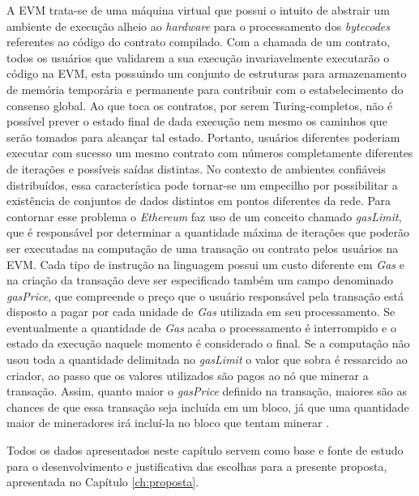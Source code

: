 %
A \ac{EVM} trata-se de uma máquina virtual que possui o intuito de abstrair um ambiente de execução alheio ao \textit{hardware} para o processamento dos \textit{bytecodes} referentes ao código do contrato compilado. Com a chamada de um contrato, todos os usuários que validarem a sua execução invariavelmente executarão o código na \ac{EVM}, esta possuindo um conjunto de estruturas para armazenamento de memória temporária e permanente para contribuir com o estabelecimento do consenso global.
%
Ao que toca os contratos, por serem Turing-completos, não é possível prever o estado final de dada execução nem mesmo os caminhos que serão tomados para alcançar tal estado. 
%
Portanto, usuários diferentes poderiam executar com sucesso um mesmo contrato com números completamente diferentes de iterações e possíveis saídas distintas.
%
No contexto de ambientes confiáveis distribuídos, essa característica pode tornar-se um empecilho por possibilitar a existência de conjuntos de dados distintos em pontos diferentes da rede.
%
Para contornar esse problema o \textit{Ethereum} faz uso de um conceito chamado \textit{gasLimit}, que é responsável por determinar a quantidade máxima de iterações que poderão ser executadas na computação de uma transação ou contrato pelos usuários na \ac{EVM}.
%
Cada tipo de instrução na linguagem possui um custo diferente em \textit{Gas} e na criação da transação deve ser especificado também um campo denominado \textit{gasPrice}, que compreende o preço que o usuário responsável pela transação está disposto a pagar por cada unidade de \textit{Gas} utilizada em seu processamento. Se eventualmente a quantidade de \textit{Gas} acaba o processamento é interrompido e o estado da execução naquele momento é considerado o final. Se a computação não usou toda a quantidade delimitada no \textit{gasLimit} o valor que sobra é ressarcido ao criador, ao passo que os valores utilizados são pagos ao nó que minerar a transação. Assim, quanto maior o \textit{gasPrice} definido na transação, maiores são as chances de que essa transação seja incluída em um bloco, já que uma quantidade maior de mineradores irá incluí-la no bloco que tentam minerar \cite{blockchain:ethereum}.

Todos os dados apresentados neste capítulo servem como base e fonte de estudo para o desenvolvimento e justificativa das escolhas para a presente proposta, apresentada no Capítulo \ref{ch:proposta}.